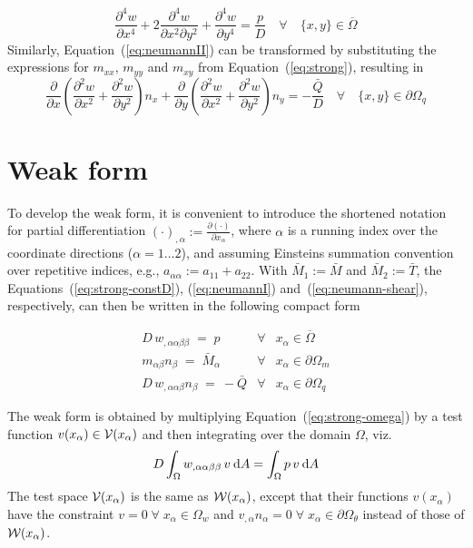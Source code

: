 \documentclass{article}
\def\deriv#1#2{\frac{\partial#1}{\partial#2}}
\def\dderiv#1#2{\frac{\partial^2#1}{\partial#2^2}}
\def\dV{\:{\rm d}A}
\begin{document}
%
\begin{equation}
  \label{eq:strong-constD}
  \frac{\partial^4w}{\partial x^4} +
 2\frac{\partial^4w}{\partial x^2\partial y^2} +
  \frac{\partial^4w}{\partial y^4} = \frac{p}{D}
  \quad\forall\quad\{x,y\}\in\overline{\Omega}
\end{equation}
%
Similarly, Equation~(\ref{eq:neumannII}) can be transformed by substituting the
expressions for $m_{xx}$, $m_{yy}$ and $m_{xy}$ from Equation~(\ref{eq:strong}),
resulting in
%
\begin{equation}
  \label{eq:neumann-shear}
  \deriv{}{x}\left(\dderiv{w}{x} + \dderiv{w}{y}\right)n_x +
  \deriv{}{y}\left(\dderiv{w}{x} + \dderiv{w}{y}\right)n_y = -\frac{\bar{Q}}{D}
  \quad\forall\quad\{x,y\}\in\partial\Omega_q
\end{equation}

\section{Weak form}

To develop the weak form, it is convenient to introduce the shortened notation
for partial differentiation $(\cdot)_{,\alpha}:=\deriv{(\cdot)}{x_\alpha}$, where
$\alpha$ is a running index over the coordinate directions ($\alpha=1\ldots2$),
and assuming Einsteins summation convention over repetitive indices,
e.g., $a_{\alpha\alpha} := a_{11} + a_{22}$.
With $\bar{M}_1:=\bar{M}$ and $\bar{M}_2:=\bar{T}$,
the Equations~(\ref{eq:strong-constD}), (\ref{eq:neumannI})
and~(\ref{eq:neumann-shear}), respectively,
can then be written in the following compact form

%
\begin{eqnarray}
  \label{eq:strong-omega}
  D\,w_{,\alpha\alpha\beta\beta} \;=\; p \quad
  &\forall&x_\alpha\in\overline{\Omega} \\[2mm]
  \label{eq:neumann-m}
  m_{\alpha\beta}n_\beta \;=\; \bar{M}_\alpha
  &\forall&x_\alpha\in\partial\Omega_m \\[2mm]
  \label{eq:neumann-q}
  D\,w_{,\alpha\alpha\beta}n_\beta \;=\: -\bar{Q}
  &\forall&x_\alpha\in\partial\Omega_q
\end{eqnarray}

The weak form is obtained by multiplying Equation~(\ref{eq:strong-omega}) by
a test function $v(x_\alpha)\in{\cal V}(x_\alpha)$ and then integrating over
the domain $\Omega$, viz.
%
\begin{equation}
  \label{eq:tested}
  D\int_\Omega w_{,\alpha\alpha\beta\beta}\,v\dV = \int_\Omega p\,v\dV
\end{equation}
%
The test space ${\cal V}(x_\alpha)$ is the same as ${\cal W}(x_\alpha)$,
except that their functions $v(x_\alpha)$ have the constraint
$v=0\;\forall\;x_\alpha\in\Omega_w$ and
$v_{,\alpha}n_\alpha=0\;\forall\;x_\alpha\in\partial\Omega_\theta$
instead of those of ${\cal W}(x_\alpha)$.
\end{document}
